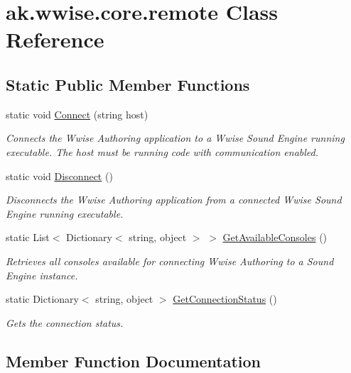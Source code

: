 \hypertarget{classak_1_1wwise_1_1core_1_1remote}{}\section{ak.\+wwise.\+core.\+remote Class Reference}
\label{classak_1_1wwise_1_1core_1_1remote}
\subsection*{Static Public Member Functions}
\begin{DoxyCompactItemize}
\item 
static void \mbox{\hyperlink{classak_1_1wwise_1_1core_1_1remote_a24dbab0160c942fd58abd514be43e41b}{Connect}} (string host)
\begin{DoxyCompactList}\small\item\em Connects the Wwise Authoring application to a Wwise Sound Engine running executable. The host must be running code with communication enabled. \end{DoxyCompactList}\item 
static void \mbox{\hyperlink{classak_1_1wwise_1_1core_1_1remote_a18eafbd35646e075e9ac8c555760ab25}{Disconnect}} ()
\begin{DoxyCompactList}\small\item\em Disconnects the Wwise Authoring application from a connected Wwise Sound Engine running executable. \end{DoxyCompactList}\item 
static List$<$ Dictionary$<$ string, object $>$ $>$ \mbox{\hyperlink{classak_1_1wwise_1_1core_1_1remote_aeead07e8dea8f4c2c2a315976169d207}{Get\+Available\+Consoles}} ()
\begin{DoxyCompactList}\small\item\em Retrieves all consoles available for connecting Wwise Authoring to a Sound Engine instance. \end{DoxyCompactList}\item 
static Dictionary$<$ string, object $>$ \mbox{\hyperlink{classak_1_1wwise_1_1core_1_1remote_a3645a2f8e771b212ef0b96297d3637bb}{Get\+Connection\+Status}} ()
\begin{DoxyCompactList}\small\item\em Gets the connection status. \end{DoxyCompactList}\end{DoxyCompactItemize}


\subsection{Member Function Documentation}
\mbox{\label{classak_1_1wwise_1_1core_1_1remote_a24dbab0160c942fd58abd514be43e41b}} 
